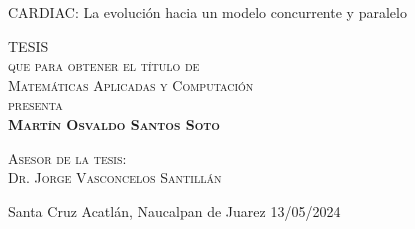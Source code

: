 \documentclass[
    fontsize=11pt,
    a4paper
   ]{scrbook}
\begin{document}
\begin{titlepage}
\begin{minipage}[c][0.81\textheight][t]{0.65\textwidth}
\begin{center}
                {\Huge CARDIAC: La evolución hacia un modelo concurrente y paralelo}\\[.3in]

                \vspace{2cm}            

                \textsc{\LARGE TESIS}\\[0.5cm]
                \textsc{\large que para obtener el título de}\\[0.5cm]
                \textsc{\large Matemáticas Aplicadas y Computación}\\[0.5cm]
                \textsc{\large presenta}\\[0.5cm]
                \textsc{\large \textbf{Martín Osvaldo Santos Soto}}\\[2cm]          

                \vspace{0.5cm}

                {\large\scshape Asesor de la tesis:\\[0.3cm] {Dr. Jorge Vasconcelos Santillán}}\\[.2in]

                \vspace{0.5cm}

                {Santa Cruz Acatlán, Naucalpan de Juarez}{ }{13/05/2024}
            \end{center}
        \end{minipage}
    \end{titlepage}
\end{document}
